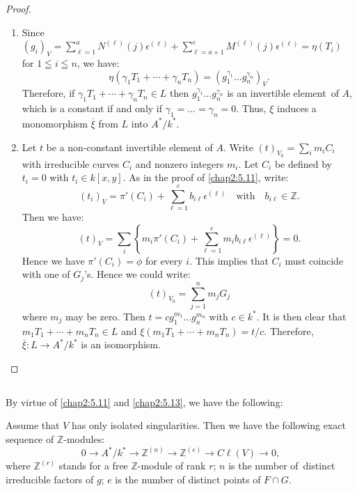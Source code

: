 \begin{proof}
\begin{enumerate}
\renewcommand{\labelenumi}{(\theenumi)}
\item Since
  $(g_{i})_{V}={\displaystyle{\mathop{\sum}_{\ell=1}^{a}}}N^{(\ell)}(j)\epsilon^{(\ell)}+{\displaystyle{\mathop{\sum}_{\ell=a+1}^{e}}}M^{(\ell)}(j)\epsilon^{(\ell)}=\eta(T_{i})$
  for $1\leqq i\leqq n$, we have:
$$
\eta(\gamma_{1}T_{1}+\cdots+\gamma_{n}T_{n})=(g^{\gamma_{1}}_{1}\ldots g^{\gamma_{n}}_{n})_{V}.
$$
Therefore, if $\gamma_{1}T_{1}+\cdots+\gamma_{n}T_{n}\in L$ then
$g^{\gamma_{1}}_{1}\ldots g^{\gamma_{n}}_{n}$ is an invertible
element\pageoriginale\ of $A$, which is a constant if and only if
$\gamma_{1}=\ldots=\gamma_{n}=0$. Thus, $\xi$ induces a monomorphism
$\overline{\xi}$ from $L$ into $A^{\ast}/k^{\ast}$. 

\item Let $t$ be a non-constant invertible element of $A$. Write
  $(t)_{V_{0}}={\displaystyle{\mathop{\sum}_{i}}}m_{i}C_{i}$ with
  irreducible curves $C_{i}$ and nonzero integers $m_{i}$. Let $C_{i}$
  be defined by $t_{i}=0$ with $t_{i}\in k[x,y]$. As in the proof of
  \ref{chap2:5.11}, write: 
$$
(t_{i})_{V}=\pi'(C_{i})+\sum^{e}_{\ell=1}b_{i\ell}\epsilon^{(\ell)}\quad\text{with}\quad
  b_{i\ell}\in \mathbb{Z}. 
$$
Then we have:
$$
(t)_{V}=\sum_{i}\left\{m_{i}\pi'(C_{i})+\sum^{e}_{\ell=1}m_{i}b_{i\ell}\epsilon^{(\ell)}\right\}=0.
$$
Hence we have $\pi'(C_{i})=\phi$ for every $i$. This implies that
$C_{i}$ must coincide with one of $G_{j}$'s. Hence we could write:
$$
(t)_{V_{0}}=\sum^{n}_{j=1}m_{j}G_{j}
$$
where $m_{j}$ may be zero. Then $t=cg^{m_{1}}_{1}\ldots g^{m_{n}}_{n}$
with $c\in k^{\ast}$. It is then clear that
$m_{1}T_{1}+\cdots+m_{n}T_{n}\in L$ and
$\xi(m_{1}T_{1}+\cdots+m_{n}T_{n})=t/c$. Therefore,
$\overline{\xi}:L\to A^{\ast}/k^{\ast}$ is an isomorphism.
\end{enumerate}
\end{proof}

\subsection{}\label{chap2:5.14}
By virtue of \ref{chap2:5.11} and \ref{chap2:5.13}, we have the following:

\begin{theorem*}
Assume that $V$ has only isolated singularities. Then we have the
following exact sequence of $\mathbb{Z}$-modules:
$$
0\to A^{\ast}/k^{\ast}\to \mathbb{Z}^{(n)}\to\mathbb{Z}^{(e)}\to
C\ell(V)\to 0,
$$
where $\mathbb{Z}^{(r)}$ stands for a free $\mathbb{Z}$-module of rank
$r$; $n$ is the number of\pageoriginale\ distinct irreducible factors
of $g$; $e$ is the number of distinct points of $F\cap G$.
\end{theorem*}

